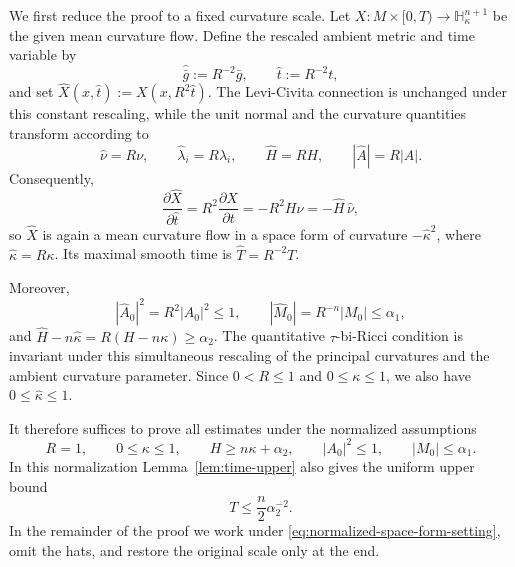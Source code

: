 \documentclass[11pt,reqno]{amsart}
\theoremstyle{definition}
\theoremstyle{remark}
\numberwithin{equation}{section}
\newcommand{\Hh}{\mathbb H}
\begin{document}
We first reduce the proof to a fixed curvature scale.  Let $X:M\times[0,T)\longrightarrow\Hh^{n+1}_{\kappa}$  
be the given mean curvature flow.  Define the rescaled ambient metric and
time variable by
\begin{equation*}
 \widehat{\bar g}:=R^{-2}\bar g,
 \qquad
 \widehat t:=R^{-2}t,
\end{equation*}
and set $ \widehat X(x,\widehat t):=X(x,R^2\widehat t)$.  
The Levi-Civita connection is unchanged under this constant rescaling, while
the unit normal and the curvature quantities transform according to
\begin{equation*}
 \widehat\nu=R\nu,\qquad
 \widehat\lambda_i=R\lambda_i,\qquad
 \widehat H=RH,\qquad
 |\widehat A|=R|A|.
\end{equation*}
Consequently,
\begin{equation*}
 \frac{\partial\widehat X}{\partial\widehat t}
 =R^2\frac{\partial X}{\partial t}
 =-R^2H\nu
 =-\widehat H\,\widehat\nu,
\end{equation*}
so $\widehat X$ is again a mean curvature flow in a space form of curvature $-\widehat\kappa^2$, where $ \widehat\kappa=R\kappa$.   Its maximal smooth time is $\widehat T=R^{-2}T$.  

Moreover,
\begin{equation*}
 |\widehat A_0|^2=R^2|A_0|^2\leq1,
 \qquad
 |\widehat M_0|=R^{-n}|M_0|\leq\alpha_1,
\end{equation*}
and $\widehat H-n\widehat\kappa
 =R(H-n\kappa)\geq\alpha_2$.  
The quantitative $\tau$-bi-Ricci condition is invariant under this
simultaneous rescaling of the principal curvatures and the ambient curvature
parameter.  Since $0<R\leq1$ and $0\leq\kappa\leq1$, we also have
$0\leq\widehat\kappa\leq1$.

It therefore suffices to prove all estimates under the normalized assumptions
\begin{equation}\label{eq:normalized-space-form-setting}
 R=1,\qquad
 0\leq\kappa\leq1,\qquad
 H\geq n\kappa+\alpha_2,\qquad
 |A_0|^2\leq1,\qquad
 |M_0|\leq\alpha_1.
\end{equation}
In this normalization Lemma~\ref{lem:time-upper} also gives the uniform
upper bound
\begin{equation}\label{eq:normalized-time-upper}
 T\leq\frac n2\alpha_2^{-2}.
\end{equation}
In the remainder of the proof we work under
\eqref{eq:normalized-space-form-setting}, omit the hats, and restore the
original scale only at the end.
\end{document}

